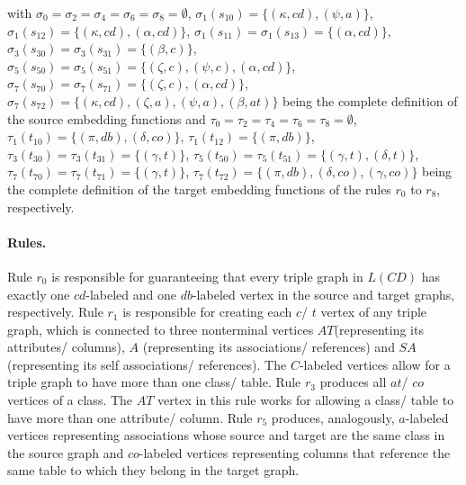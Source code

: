 \noindent
with $\sigma_0 = \sigma_2 = \sigma_4 = \sigma_6 = \sigma_8 = \emptyset$, $\sigma_1(s_{10}) = \{(\kappa,cd),(\psi,a)\}$, $\sigma_1(s_{12}) = \{(\kappa,cd),(\alpha, cd)\}$, $\sigma_1(s_{11}) = \sigma_1(s_{13}) =\{(\alpha, cd)\}$, $\sigma_3(s_{30}) = \sigma_3(s_{31}) = \{(\beta,c)\}$, $\sigma_5(s_{50}) = \sigma_5(s_{51}) = \{(\zeta,c),(\psi,c),(\alpha,cd)\}$, $\sigma_7(s_{70}) = \sigma_7(s_{71}) = \{(\zeta,c),(\alpha,cd)\}$, $\sigma_7(s_{72}) = \{(\kappa,cd),(\zeta,a),(\psi,a),(\beta,at)\}$ being the complete definition of the source embedding functions and $\tau_0 = \tau_2 = \tau_4 = \tau_6 = \tau_8 = \emptyset$, $\tau_1(t_{10}) = \{(\pi,db),(\delta,co)\}$, $\tau_1(t_{12}) = \{(\pi,db)\}$, $\tau_3(t_{30}) = \tau_3(t_{31}) = \{(\gamma,t)\}$, $\tau_5(t_{50}) = \tau_5(t_{51}) = \{(\gamma,t),(\delta,t)\}$, $\tau_7(t_{70}) = \tau_7(t_{71}) = \{(\gamma,t)\}$, $\tau_7(t_{72}) = \{(\pi,db),(\delta,co),(\gamma,co)\}$ being the complete definition of the target embedding functions of the rules $r_0$ to $r_8$, respectively.

\paragraph*{Rules. } Rule $r_0$ is responsible for guaranteeing that every triple graph in $L(CD)$ has exactly one $cd$-labeled and one $db$-labeled vertex in the source and target graphs, respectively. Rule $r_1$ is responsible for creating each $c$/ $t$ vertex of any triple graph, which is connected to three nonterminal vertices $AT$(representing its attributes/ columns), $A$ (representing its associations/ references) and $SA$ (representing its self associations/ references). The $C$-labeled vertices allow for a triple graph to have more than one class/ table. Rule $r_3$ produces all $at$/ $co$ vertices of a class. The $AT$ vertex in this rule works for allowing a class/ table to have more than one attribute/ column. Rule $r_5$ produces, analogously, $a$-labeled vertices representing associations whose source and target are the same class in the source graph and $co$-labeled vertices representing columns that reference the same table to which they belong in the target graph. 

